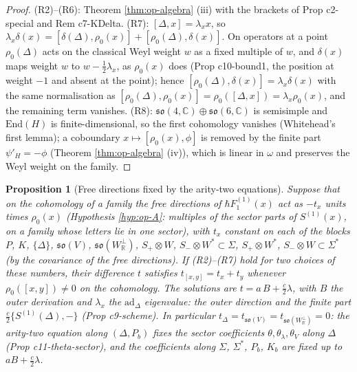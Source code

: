 \documentclass[11pt]{article}
\numberwithin{equation}{section}
\theoremstyle{plain}
\newtheorem{proposition}[theorem]{Proposition}
\theoremstyle{definition}
\begin{document}
\begin{proof}
(R2)--(R6): Theorem \ref{thm:op-algebra} (iii) with the brackets of Prop c2-special and Rem c7-KDelta. (R7): $[\Delta,x]=\lambda_xx$, so $\lambda_x\delta(x)=[\delta(\Delta),\rho_0(x)]+[\rho_0(\Delta),\delta(x)]$. On operators at a point $\rho_0(\Delta)$ acts on the classical Weyl weight $w$ as a fixed multiple of $w$, and $\delta(x)$ maps weight $w$ to $w-\tfrac12\lambda_x$, as $\rho_0(x)$ does (Prop c10-bound1, the position at weight $-1$ and absent at the point); hence $[\rho_0(\Delta),\delta(x)]=\lambda_x\delta(x)$ with the same normalisation as $[\rho_0(\Delta),\rho_0(x)]=\rho_0([\Delta,x])=\lambda_x\rho_0(x)$, and the remaining term vanishes. (R8): $\mathfrak{so}(4,\mathbb C)\oplus\mathfrak{so}(6,\mathbb C)$ is semisimple and $\mathrm{End}(H)$ is finite-dimensional, so the first cohomology vanishes (Whitehead's first lemma); a coboundary $x\mapsto[\rho_0(x),\phi]$ is removed by the finite part $\psi'_H=-\phi$ (Theorem \ref{thm:op-algebra} (iv)), which is linear in $\omega$ and preserves the Weyl weight on the family.
\end{proof}

\begin{proposition}[Free directions fixed by the arity-two equations]
\label{prop:op-tfix}
Suppose that on the cohomology of a family the free directions of $\hbar F_1^{(1)}(x)$ act as $-t_x$ units times $\rho_0(x)$ (Hypothesis \ref{hyp:op-A}: multiples of the sector parts of $S^{(1)}(x)$, on a family whose letters lie in one sector), with $t_x$ constant on each of the blocks $P$, $K$, $\{\Delta\}$, $\mathfrak{so}(V)$, $\mathfrak{so}(W_{\mathbb R}^\perp)$, $S_+\otimes W$, $S_-\otimes W^*\subset\Sigma$, $S_+\otimes W^*$, $S_-\otimes W\subset\Sigma^*$ (by the covariance of the free directions). If (R2)--(R7) hold for two choices of these numbers, their difference $t$ satisfies $t_{[x,y]}=t_x+t_y$ whenever $\rho_0([x,y])\ne0$ on the cohomology. The solutions are $t=a\,B+\tfrac c2\lambda$, with $B$ the outer derivation and $\lambda_x$ the $\mathrm{ad}_\Delta$ eigenvalue: the outer direction and the finite part $\tfrac c2\{S^{(1)}(\Delta),-\}$ (Prop c9-scheme). In particular $t_\Delta=t_{\mathfrak{so}(V)}=t_{\mathfrak{so}(W_{\mathbb R}^\perp)}=0$: the arity-two equation along $(\Delta,P_b)$ fixes the sector coefficients $\theta,\theta_\lambda,\theta_V$ along $\Delta$ (Prop c11-theta-sector), and the coefficients along $\Sigma$, $\Sigma^*$, $P_b$, $K_b$ are fixed up to $aB+\tfrac c2\lambda$.
\end{proposition}
\end{document}
